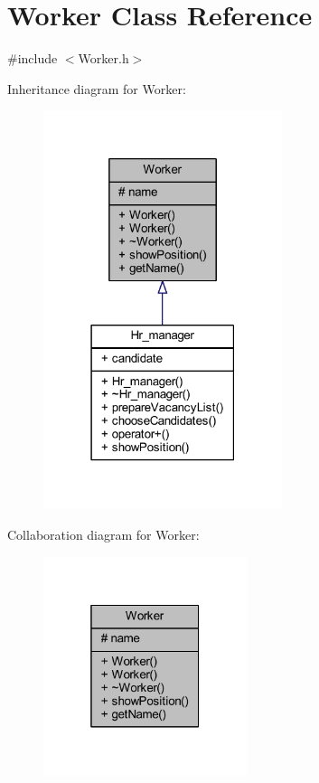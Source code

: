 \hypertarget{class_worker}{}\section{Worker Class Reference}
\label{class_worker}


{\ttfamily \#include $<$Worker.\+h$>$}



Inheritance diagram for Worker\+:
\nopagebreak
\begin{figure}[H]
\begin{center}
\leavevmode
\includegraphics[width=198pt]{class_worker__inherit__graph}
\end{center}
\end{figure}


Collaboration diagram for Worker\+:
\nopagebreak
\begin{figure}[H]
\begin{center}
\leavevmode
\includegraphics[width=169pt]{class_worker__coll__graph}
\end{center}
\end{figure}
